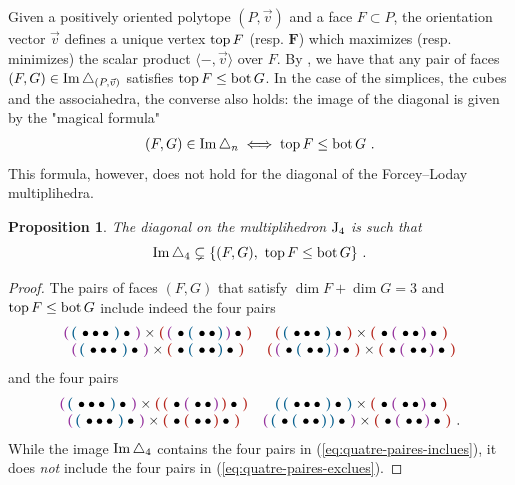 \documentclass[twoside, 12pt]{amsart}
\newtheorem{proposition}[definition]{Proposition}
\theoremstyle{remark}
\begin{document}
Given a positively oriented polytope $(P, \vec v)$ and a face $F \subset P$, the orientation vector $\vec v$ defines a unique vertex $\operatorname{top} F$ (resp. $\bm F$) which maximizes (resp. minimizes) the scalar product $\langle - , \vec v \rangle$ over $F$. 
By \cite[Proposition 1.15]{LA21}, we have that any pair of faces $(F,G) \in \operatorname{Im} \triangle_{(P,\vec v)}$ satisfies $\operatorname{top} F \leq \operatorname{bot} G$. 
In the case of the simplices, the cubes and the associahedra, the converse also holds: the image of the diagonal is given by the "magical formula" 
\begin{align}
\label{eq:magical-formula}
(F,G) \in \operatorname{Im} \triangle_n \iff \operatorname{top} F\leq \operatorname{bot} G \ . 
\end{align}
This formula, however, does not hold for the diagonal of the Forcey--Loday multiplihedra. 

\begin{proposition} \label{prop:pas-top-bot}
The diagonal on the multiplihedron $\mathrm{J}_4$ is such that
\[ \Ima \triangle_4 \subsetneq \{ (F,G) , \ \tp F\leq \bm G \} \ . \]
\end{proposition}
\begin{proof}
The pairs of faces $(F,G)$ that satisfy $\dim F + \dim G = 3$ and $\operatorname{top} F\leq \operatorname{bot} G$ include indeed the four pairs 
\begin{equation} \label{eq:quatre-paires-inclues}
\begin{matrix}
\purple{\blue{\bullet \bullet \bullet}\bullet} \times \red{\purple{\bullet\blue{\bullet\bullet}}\bullet} & 
\red{\blue{\bullet\bullet\bullet}\bullet} \times \red{\bullet\purple{\bullet\bullet}\bullet}  \\
\purple{\blue{\bullet\bullet\bullet}\bullet} \times \red{\bullet\blue{\bullet\bullet}\bullet} &
\red{\purple{\bullet\blue{\bullet\bullet}}\bullet} \times \red{\bullet\purple{\bullet\bullet}\bullet}  
\end{matrix}
\end{equation}
and the four pairs
\begin{equation} \label{eq:quatre-paires-exclues}
\begin{matrix}
\purple{\blue{\bullet \bullet \bullet}\bullet} \times \red{\red{\bullet\purple{\bullet\bullet}}\bullet} & 
\blue{\blue{\bullet\bullet\bullet}\bullet} \times \red{\bullet\purple{\bullet\bullet}\bullet}  \\
\purple{\blue{\bullet\bullet\bullet}\bullet} \times \red{\bullet\red{\bullet\bullet}\bullet} &
\purple{\blue{\bullet\blue{\bullet\bullet}}\bullet} \times \red{\bullet\purple{\bullet\bullet}\bullet}  \ .
\end{matrix}
\end{equation}
While the image $\operatorname{Im} \triangle_4$ contains the four pairs in (\ref{eq:quatre-paires-inclues}), it does \emph{not} include the four pairs in (\ref{eq:quatre-paires-exclues}).
\end{proof}
\end{document}
